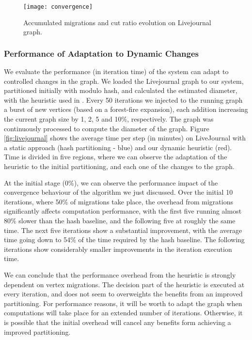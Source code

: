 \documentclass{sig-alternate-10pt}
\begin{document}
\begin{figure}
  \centering
    \texttt{[image: convergence]}
    \vspace{-10pt}
  \caption{ Accumulated migrations and cut ratio evolution on Livejournal graph. }
 	\vspace{-15pt}
  \label{fig:migrations}
\end{figure}


\subsubsection{Performance of Adaptation to Dynamic Changes}

We evaluate the performance (in iteration time) of the system can adapt to controlled changes in the graph. We loaded the Livejournal graph to our system, partitioned initially with modulo hash, and calculated the estimated diameter, with the heuristic used in \cite{Mizan}. Every 50 iterations we injected to the running graph a burst of new vertices (based on a forest-fire expansion), each addition increasing the current graph size by 1, 2, 5 and 10\%, respectively. The graph was continuously processed to compute the diameter of the graph. Figure \ref{fig:livejournal} shows the average time per step (in minutes) on LiveJournal with a static approach (hash partitioning - blue) and our dynamic heuristic (red). Time is divided in five regions, where we can observe the adaptation of the heuristic to the initial partitioning, and each one of the changes to the graph. 

At the initial stage (0\%), we can observe the performance impact of the convergence behaviour of the algorithm we just discussed. Over the initial 10 iterations, where 50\% of migrations take place, the overhead from migrations significantly affects computation performance, with the first five running almost 80\% slower than the hash baseline, and the following five at roughly the same time. The next five iterations show a substantial improvement, with the average time going down to 54\% of the time required by the hash baseline. The following iterations show considerably smaller improvements in the iteration execution time. 

We can conclude that the performance overhead from the heuristic is strongly dependent on vertex migrations. The decision part of the heuristic is executed at every iteration, and does not seem to overweights the benefits from an improved partitioning. For performance reasons, it will be worth to adapt the graph when computations will take place for an extended number of iterations. Otherwise, it is possible that the initial overhead will cancel any benefits form achieving a improved partitioning.  
\end{document}
